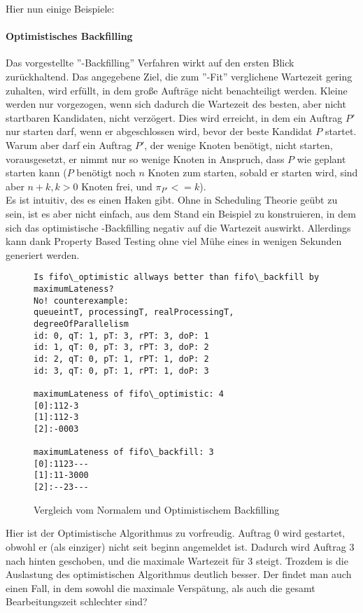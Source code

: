 Hier nun einige Beispiele:\\

\paragraph{Optimistisches Backfilling}
\label{optfill}
Das vorgestellte ''-Backfilling'' Verfahren wirkt auf den ersten Blick zurückhaltend. Das angegebene Ziel, die zum ''-Fit'' verglichene Wartezeit gering zuhalten, wird erfüllt, in dem große Aufträge nicht benachteiligt werden. Kleine werden nur vorgezogen, wenn sich dadurch die Wartezeit des besten, aber nicht startbaren Kandidaten, nicht verzögert. Dies wird erreicht, in dem ein Auftrag $P'$ nur starten darf, wenn er abgeschlossen wird, bevor der beste Kandidat $P$ startet.\\
Warum aber darf ein Auftrag $P'$, der wenige Knoten benötigt, nicht starten, vorausgesetzt, er nimmt nur so wenige Knoten in Anspruch, dass $P$ wie geplant starten kann ($P$ benötigt noch $n$ Knoten zum starten, sobald er starten wird, sind aber $n+k, k>0$ Knoten frei, und $\pi_{P'} <= k$).\\
Es ist intuitiv, des es einen Haken gibt. Ohne in Scheduling Theorie geübt zu sein, ist es aber nicht einfach, aus dem Stand ein Beispiel zu konstruieren, in dem sich das optimistische -Backfilling negativ auf die Wartezeit auswirkt. Allerdings kann dank Property Based Testing ohne viel Mühe eines in wenigen Sekunden generiert werden.

\begin{figure}
\centering
\begin{verbatim}
Is fifo\_optimistic allways better than fifo\_backfill by maximumLateness?
No! counterexample:
queueintT, processingT, realProcessingT, degreeOfParallelism
id: 0, qT: 1, pT: 3, rPT: 3, doP: 1
id: 1, qT: 0, pT: 3, rPT: 3, doP: 2
id: 2, qT: 0, pT: 1, rPT: 1, doP: 2
id: 3, qT: 0, pT: 1, rPT: 1, doP: 3

maximumLateness of fifo\_optimistic: 4
[0]:112-3
[1]:112-3
[2]:-0003

maximumLateness of fifo\_backfill: 3
[0]:1123---
[1]:11-3000
[2]:--23---
\end{verbatim}
\caption{Vergleich vom Normalem und Optimistischem Backfilling}
\label{onlateness}
\end{figure}

\FloatBarrier

Hier ist der Optimistische Algorithmus zu vorfreudig. Auftrag 0 wird gestartet, obwohl er (als einziger) nicht seit beginn angemeldet ist. Dadurch wird Auftrag 3 nach hinten geschoben, und die maximale Wartezeit für 3 steigt. Trozdem is die Auslastung des optimistischen Algorithmus deutlich besser. Der findet man auch einen Fall, in dem sowohl die maximale Verspätung, als auch die gesamt Bearbeitungszeit schlechter sind?\\


